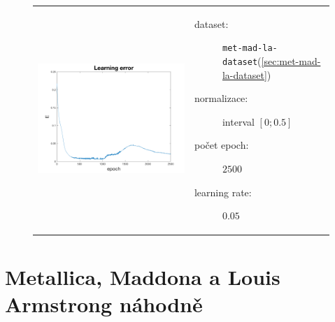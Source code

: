 \documentclass[thesis=M,czech]{FITthesis}[2012/06/26]
\begin{document}
\begin{figure}[htbp]
\begin{tabular}{p{}p{}}
    \begin{minipage}{.5\textwidth}
    \centering
    \includegraphics[scale=0.3]{err_met-mad-la.png}
    \label{fig:fig1}
    \end{minipage}
    &
    \begin{minipage}{.5\textwidth}
		\begin{description}
            \item[dataset:] \texttt{met-mad-la-dataset}(\ref{sec:met-mad-la-dataset})
            \item[normalizace:] interval $[0;0.5]$
            \item[počet epoch:] $2500$
            \item[learning rate:] $0.05$
        \end{description}
\end{minipage}
\end{tabular}
\end{figure}



\section{Metallica, Maddona a Louis Armstrong náhodně}\label{exp:met-mad-la-random}
\end{document}

